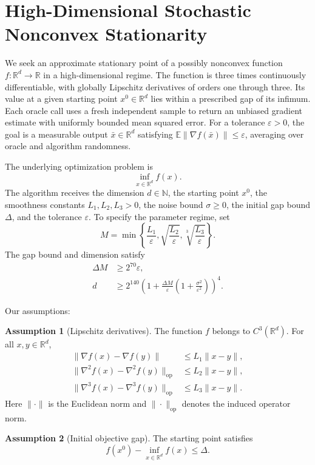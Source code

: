 \documentclass[10pt]{article}
\theoremstyle{definition}
\newtheorem{assumption}{Assumption}
\begin{document}
\section*{High-Dimensional Stochastic Nonconvex Stationarity}
We seek an approximate stationary point of a possibly nonconvex function $f:\mathbb{R}^d\to\mathbb{R}$ in a high-dimensional regime. The function is three times continuously differentiable, with globally Lipschitz derivatives of orders one through three. Its value at a given starting point $x^0\in\mathbb{R}^d$ lies within a prescribed gap of its infimum. Each oracle call uses a fresh independent sample to return an unbiased gradient estimate with uniformly bounded mean squared error. For a tolerance $\varepsilon>0$, the goal is a measurable output $\bar{x}\in\mathbb{R}^d$ satisfying $\mathbb{E}\|\nabla f(\bar{x})\|\leq\varepsilon$, averaging over oracle and algorithm randomness.

The underlying optimization problem is
\[
\inf_{x\in\mathbb{R}^d} f(x).
\]
The algorithm receives the dimension $d\in\mathbb{N}$, the starting point $x^0$, the smoothness constants $L_1,L_2,L_3>0$, the noise bound $\sigma\geq 0$, the initial gap bound $\Delta$, and the tolerance $\varepsilon$. To specify the parameter regime, set
\[
M=\min\left\{\frac{L_1}{\varepsilon},\sqrt{\frac{L_2}{\varepsilon}},\sqrt[3]{\frac{L_3}{\varepsilon}}\right\}.
\]
The gap bound and dimension satisfy
\[
\begin{aligned}
\Delta M &\geq 2^{70}\varepsilon,\\
d &\geq 2^{140}\left(1+\frac{\Delta M}{\varepsilon}\left(1+\frac{\sigma^2}{\varepsilon^2}\right)\right)^4.
\end{aligned}
\]

Our assumptions:
\begin{assumption}[Lipschitz derivatives]
The function $f$ belongs to $C^3(\mathbb{R}^d)$. For all $x,y\in\mathbb{R}^d$,
\[
\begin{aligned}
\|\nabla f(x)-\nabla f(y)\| &\leq L_1\|x-y\|,\\
\|\nabla^2 f(x)-\nabla^2 f(y)\|_{\mathrm{op}} &\leq L_2\|x-y\|,\\
\|\nabla^3 f(x)-\nabla^3 f(y)\|_{\mathrm{op}} &\leq L_3\|x-y\|.
\end{aligned}
\]
Here $\|\cdot\|$ is the Euclidean norm and $\|\cdot\|_{\mathrm{op}}$ denotes the induced operator norm.
\end{assumption}

\begin{assumption}[Initial objective gap]
The starting point satisfies
\[
f(x^0)-\inf_{x\in\mathbb{R}^d}f(x)\leq\Delta.
\]
\end{assumption}
\end{document}
